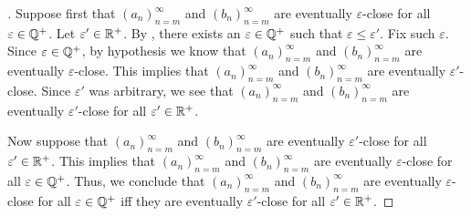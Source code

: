 \begin{proof}[]
  Suppose first that \((a_n)_{n = m}^\infty\) and \((b_n)_{n = m}^\infty\) are eventually \(\varepsilon\)-close for all \(\varepsilon \in \mathbb{Q}^+\).
  Let \(\varepsilon' \in \mathbb{R}^+\).
  By , there exists an \(\varepsilon \in \mathbb{Q}^+\) such that \(\varepsilon \leq \varepsilon'\).
  Fix such \(\varepsilon\).
  Since \(\varepsilon \in \mathbb{Q}^+\), by hypothesis we know that \((a_n)_{n = m}^\infty\) and \((b_n)_{n = m}^\infty\) are eventually \(\varepsilon\)-close.
  This implies that \((a_n)_{n = m}^\infty\) and \((b_n)_{n = m}^\infty\) are eventually \(\varepsilon'\)-close.
  Since \(\varepsilon'\) was arbitrary, we see that \((a_n)_{n = m}^\infty\) and \((b_n)_{n = m}^\infty\) are eventually \(\varepsilon'\)-close for all \(\varepsilon' \in \mathbb{R}^+\).

  Now suppose that \((a_n)_{n = m}^\infty\) and \((b_n)_{n = m}^\infty\) are eventually \(\varepsilon'\)-close for all \(\varepsilon' \in \mathbb{R}^+\).
  This implies that \((a_n)_{n = m}^\infty\) and \((b_n)_{n = m}^\infty\) are eventually \(\varepsilon\)-close for all \(\varepsilon \in \mathbb{Q}^+\).
  Thus, we conclude that \((a_n)_{n = m}^\infty\) and \((b_n)_{n = m}^\infty\) are eventually \(\varepsilon\)-close for all \(\varepsilon \in \mathbb{Q}^+\) iff they are eventually \(\varepsilon'\)-close for all \(\varepsilon' \in \mathbb{R}^+\).
\end{proof}
